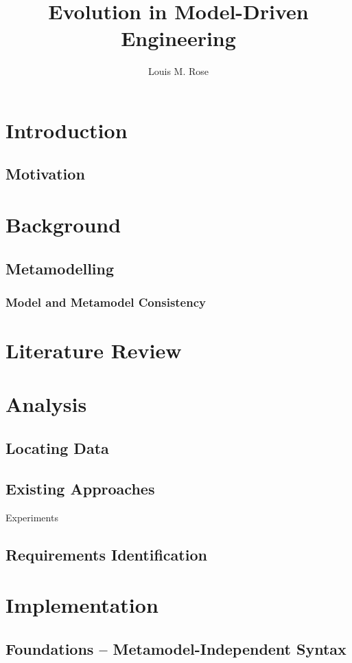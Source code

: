 \documentclass[a4paper]{book}
\title{Evolution in Model-Driven Engineering}
\author{Louis M. Rose}
\begin{document}
\maketitle

\tableofcontents

\chapter{Introduction}

\section{Motivation}

\chapter{Background}
\section{Metamodelling}
\subsection{Model and Metamodel Consistency}

\chapter{Literature Review}

\chapter{Analysis}
\section{Locating Data}
\section{Existing Approaches}
Experiments
\section{Requirements Identification}

\chapter{Implementation}
\section{Foundations -- Metamodel-Independent Syntax}
\end{document}
